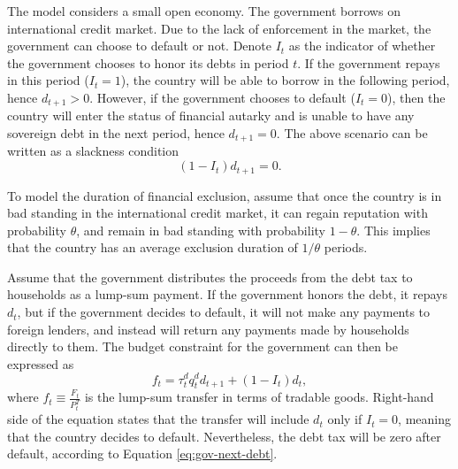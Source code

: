The model considers a small open economy. The government borrows on international credit market.
Due to the lack of enforcement in the market, the government can choose to default or not. Denote $I_t$ as the indicator of whether the government chooses to honor its debts in period $t$. If the government repays in this period ($I_{t} = 1$), the country will be able to borrow in the following period, hence $d_{t+1} > 0$. However, if the government chooses to default ($I_t = 0$), then the country will enter the status of financial autarky and is unable to have any sovereign debt in the next period, hence $d_{t+1} = 0$. The above scenario can be written as a slackness condition
\begin{equation}
    \label{eq:gov-next-debt}
    (1 - I_t)d_{t+1} = 0 .
\end{equation}

To model the duration of financial exclusion, assume that once the country is in bad standing in the international credit market, it can regain reputation with probability $\theta$, and remain in bad standing with probability $1-\theta$. This implies that the country has an average exclusion duration of $1/\theta$ periods.

Assume that the government distributes the proceeds from the debt tax to households as a lump-sum payment. If the government honors the debt, it repays $d_t$, but if the government decides to default, it will not make any payments to foreign lenders, and instead will return any payments made by households directly to them. The budget constraint for the government can then be expressed as
\begin{equation}
    \label{eq:gov-budget}
    f_t = \tau_t^d q_t^d d_{t+1} + (1-I_t)d_t,
\end{equation}
where $f_t \equiv \frac{F_t}{P^T_t}$ is the lump-sum transfer in terms of tradable goods. Right-hand side of the equation states that the transfer will include $d_t$ only if $I_t = 0$, meaning that the country decides to default. Nevertheless, the debt tax will be zero after default, according to Equation \eqref{eq:gov-next-debt}.
